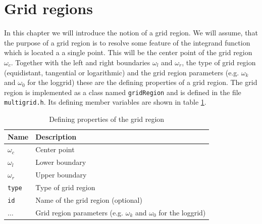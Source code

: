 \section{Grid regions}\label{sec:grid_regions}
In this chapter we will introduce the notion of a grid region. We will assume, that the purpose of a grid region is to resolve some feature of the integrand function which is located a a single point. This will be the center point of the grid region $\omega_c$. Together with the left and right boundaries $\omega_l$ and $\omega_r$, the type of grid region (equidistant, tangential or logarithmic) and the grid region parameters (e.g. $\omega_k$ and $\omega_0$ for the loggrid) these are the defining properties of a grid region. The grid region is implemented as a class named \texttt{gridRegion} and is defined in the file \texttt{multigrid.h}. Its defining member variables are shown in table \ref{tab:grid_region_defining_members}.
\begin{table}[h]
	\begin{center}
		\begin{tabular}{ll}
		Name & Description \\ 
		\hline
		$\omega_c$  & Center point \\
		$\omega_l$  & Lower boundary \\
		$\omega_r$  & Upper boundary \\
		\texttt{type}  & Type of grid region \\
		\texttt{id}  & Name of the grid region (optional) \\
		 $\dots$ & Grid region parameters (e.g. $\omega_k$ and $\omega_0$ for the loggrid) \\
		\end{tabular}
	\end{center}
	\caption{Defining properties of the grid region}
	\label{tab:grid_region_defining_members}
\end{table}

